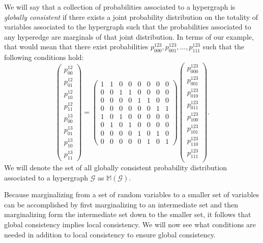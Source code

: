 We will say that a collection of probabilities associated to a
hypergraph is \emph{globally consistent} if there exists a joint
probability distribution on the totality of variables associated to
the hypergraph such that the probabilities associated to any hyperedge
are marginals of that joint distribution.  In terms of our example,
that would mean that there exist probabilities $p^{123}_{000},
p^{123}_{001}, \ldots, p^{123}_{111}$ such that the following
conditions hold:
\begin{equation}
 \begin{pmatrix}
  p^{12}_{00}\\
  p^{12}_{01}\\
  p^{12}_{10}\\
  p^{12}_{11}\\
  p^{13}_{00}\\
  p^{13}_{01}\\
  p^{13}_{10}\\
  p^{13}_{11}
 \end{pmatrix} =
 \begin{pmatrix}
  1 & 1 & 0 & 0 & 0 & 0 & 0 & 0\\
  0 & 0 & 1 & 1 & 0 & 0 & 0 & 0\\
  0 & 0 & 0 & 0 & 1 & 1 & 0 & 0\\
  0 & 0 & 0 & 0 & 0 & 0 & 1 & 1\\
  1 & 0 & 1 & 0 & 0 & 0 & 0 & 0\\
  0 & 1 & 0 & 1 & 0 & 0 & 0 & 0\\
  0 & 0 & 0 & 0 & 1 & 0 & 1 & 0\\
  0 & 0 & 0 & 0 & 0 & 1 & 0 & 1
 \end{pmatrix}
 \begin{pmatrix}
  p^{123}_{000}\\
  p^{123}_{001}\\
  p^{123}_{010}\\
  p^{123}_{011}\\
  p^{123}_{100}\\
  p^{123}_{101}\\
  p^{123}_{110}\\
  p^{123}_{111}\\
 \end{pmatrix}.
\end{equation}
We will denote the set of all globally consistent probability
distribution associated to a hypergraph $\mathcal{G}$ as
$\mathbb{M}(\mathcal{G})$.

Because marginalizing from a set of random variables to a smaller set
of variables can be accomplished by first marginalizing to an
intermediate set and then marginalizing form the intermediate set down
to the smaller set, it follows that global consistency implies local
consistency.  We will now see what conditions are needed in
addition to local consistency to ensure global consistency.

